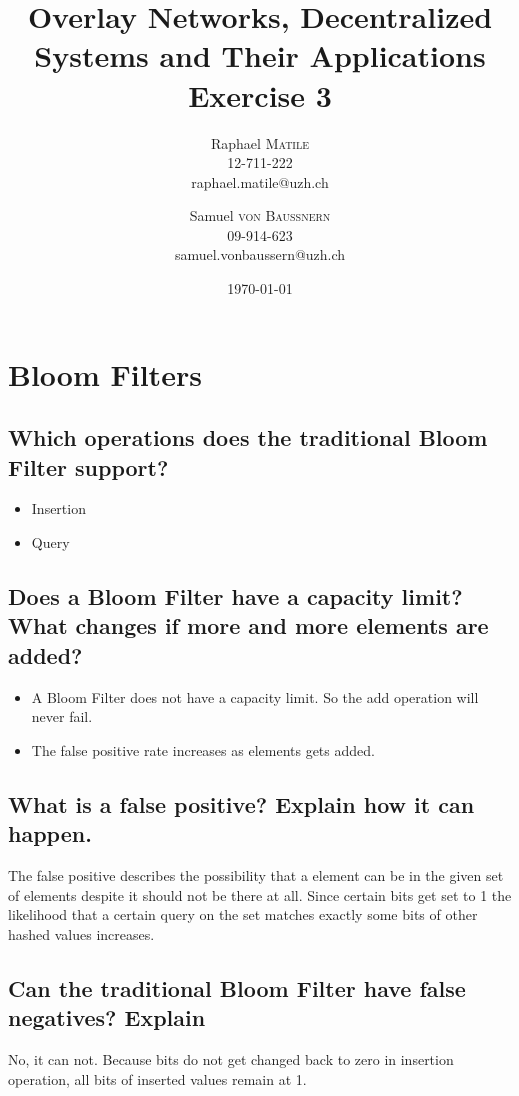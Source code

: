 \documentclass{article}
\title{Overlay Networks, Decentralized Systems and Their Applications
\\Exercise 3}
\author{Raphael \textsc{Matile}\\12-711-222\\raphael.matile@uzh.ch
\and Samuel \textsc{von Baussnern}\\09-914-623\\samuel.vonbaussern@uzh.ch}
\date{\today} %
\begin{document}
\maketitle %

\section{Bloom Filters}

\subsection{Which operations does the traditional Bloom Filter support?}

  \begin{itemize}
    \item Insertion
    \item Query
  \end{itemize}

\subsection{Does a Bloom Filter have a capacity limit? What changes if more and more elements are added?}

  \begin{itemize}
    \item A Bloom Filter does not have a capacity limit. So the add operation will never fail.
    \item The false positive rate increases as elements gets added.
  \end{itemize}

\subsection{What is a false positive? Explain how it can happen.}

  The false positive describes the possibility that a element can be in the given
  set of elements despite it should not be there at all.
  Since certain bits get set to 1 the likelihood that a certain query on the set
  matches exactly some bits of other hashed values increases.

\subsection{Can the traditional Bloom Filter have false negatives? Explain}

  No, it can not. Because bits do not get changed back to zero in insertion
  operation, all bits of inserted values remain at 1.
\end{document}
